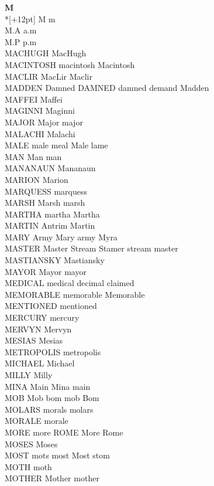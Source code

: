 \vspace{14pt}
\noindent\textbf{\Large M}\\*[+12pt]
M m\\
M.A a.m\\
M.P p.m\\
MACHUGH MacHugh\\
MACINTOSH macintosh Macintosh\\
MACLIR MacLir Maclir\\
MADDEN Damned DAMNED damned demand Madden\\
MAFFEI Maffei\\
MAGINNI Maginni\\
MAJOR Major major\\
MALACHI Malachi\\
MALE male meal Male lame\\
MAN Man man\\
MANANAUN Mananaun\\
MARION Marion\\
MARQUESS marquess\\
MARSH Marsh marsh\\
MARTHA martha Martha\\
MARTIN Antrim Martin\\
MARY Army Mary army Myra\\
MASTER Master Stream Stamer stream master\\
MASTIANSKY Mastiansky\\
MAYOR Mayor mayor\\
MEDICAL medical decimal claimed\\
MEMORABLE memorable Memorable\\
MENTIONED mentioned\\
MERCURY mercury\\
MERVYN Mervyn\\
MESIAS Mesias\\
METROPOLIS metropolis\\
MICHAEL Michael\\
MILLY Milly\\
MINA Main Mina main\\
MOB Mob bom mob Bom\\
MOLARS morals molars\\
MORALE morale\\
MORE more ROME More Rome\\
MOSES Moses\\
MOST mots most Most stom\\
MOTH moth\\
MOTHER Mother mother\\
